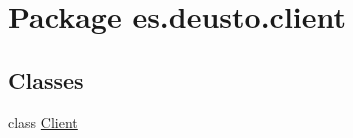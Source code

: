 \hypertarget{namespacees_1_1deusto_1_1client}{}\section{Package es.\+deusto.\+client}
\label{namespacees_1_1deusto_1_1client}
\subsection*{Classes}
\begin{DoxyCompactItemize}
\item 
class \hyperlink{classes_1_1deusto_1_1client_1_1_client}{Client}
\end{DoxyCompactItemize}
